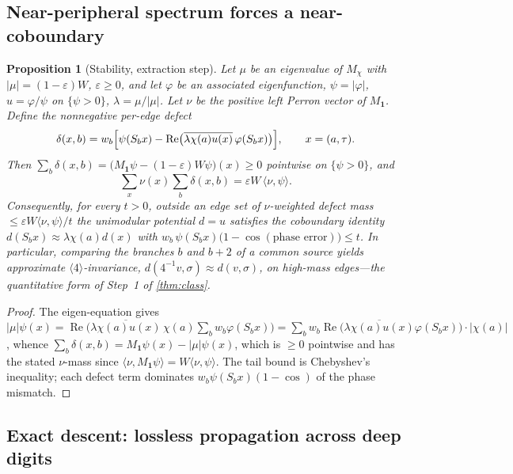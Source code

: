 \documentclass[11pt]{article}
\theoremstyle{plain}
\newtheorem{proposition}{Proposition}
\theoremstyle{definition}
\theoremstyle{remark}
\begin{document}
\subsection*{Near-peripheral spectrum forces a near-coboundary}

\begin{proposition}[Stability, extraction step]\label{prop:stab}
Let $\mu$ be an eigenvalue of $M_\chi$ with $\lvert\mu\rvert=(1-\varepsilon)W$,
$\varepsilon\ge0$, and let $\varphi$ be an associated eigenfunction,
$\psi=\lvert\varphi\rvert$, $u=\varphi/\psi$ on $\{\psi>0\}$,
$\lambda=\mu/\lvert\mu\rvert$. Let $\nu$ be the positive left Perron vector of
$M_{\mathbf1}$. Define the nonnegative per-edge defect
\[
\delta(x,b)=w_b\Bigl[\psi(S_bx)-\operatorname{Re}\bigl(\overline{\lambda\chi(a)u(x)}\,
\varphi(S_bx)\bigr)\Bigr],\qquad x=(a,\tau).
\]
Then $\sum_b\delta(x,b)=\bigl(M_{\mathbf1}\psi-(1-\varepsilon)W\psi\bigr)(x)\ge0$
pointwise on $\{\psi>0\}$, and
\[
\sum_x\nu(x)\sum_b\delta(x,b)=\varepsilon W\,\langle\nu,\psi\rangle .
\]
Consequently, for every $t>0$, outside an edge set of
$\nu$-weighted defect mass $\le\varepsilon W\langle\nu,\psi\rangle/t$ the
unimodular potential $d=u$ satisfies the coboundary identity
$d(S_bx)\approx\lambda\chi(a)d(x)$ with
$w_b\,\psi(S_bx)\bigl(1-\cos(\text{phase error})\bigr)\le t$. In particular,
comparing the branches $b$ and $b{+}2$ of a common source yields approximate
$\langle4\rangle$-invariance, $d(4^{-1}v,\sigma)\approx d(v,\sigma)$, on
high-mass edges---the quantitative form of Step~1 of \cref{thm:class}.
\end{proposition}
\begin{proof}
The eigen-equation gives
$\lvert\mu\rvert\psi(x)=\operatorname{Re}\bigl(\overline{\lambda\chi(a)u(x)}\,
\chi(a)\sum_bw_b\varphi(S_bx)\bigr)
=\sum_bw_b\operatorname{Re}\bigl(\overline{\lambda\chi(a)u(x)}\varphi(S_bx)\bigr)
\cdot\lvert\chi(a)\rvert$, whence
$\sum_b\delta(x,b)=M_{\mathbf1}\psi(x)-\lvert\mu\rvert\psi(x)$, which is
$\ge0$ pointwise and has the stated $\nu$-mass since
$\langle\nu,M_{\mathbf1}\psi\rangle=W\langle\nu,\psi\rangle$. The tail bound is
Chebyshev's inequality; each defect term dominates
$w_b\psi(S_bx)(1-\cos)$ of the phase mismatch.
\end{proof}

\subsection*{Exact descent: lossless propagation across deep digits}
\end{document}
